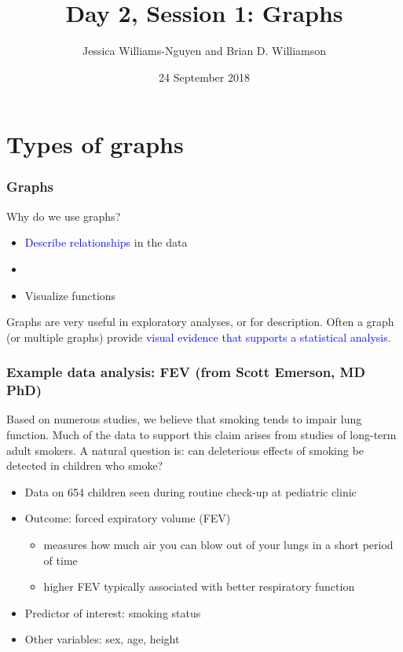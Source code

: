 \documentclass[11pt, hyperref={colorlinks, urlcolor=blue}]{beamer}
\title{Day 2, Session 1: Graphs}
\author{Jessica Williams-Nguyen and Brian D. Williamson}
\institute{EPI/BIOST Bootcamp 2018}
\date{24 September 2018}
\newcommand{\myframe}[1]{\begin{frame} \frametitle{#1}}
\newenvironment{spaceitemize}
{ \begin{itemize}
    \setlength{\itemsep}{10pt}
    \setlength{\parskip}{0pt}
    \setlength{\parsep}{0pt}     }
{ \end{itemize}                  }
\begin{document}
\begin{frame}
\titlepage
\end{frame}

\section{Types of graphs}
\myframe{Graphs}
Why do we use graphs?
\begin{itemize}
\item \textcolor{blue}{Describe relationships} in the data
\item[]
\item Visualize functions
\end{itemize}

Graphs are very useful in exploratory analyses, or for description. Often a graph (or multiple graphs) provide \textcolor{blue}{visual evidence that supports a statistical analysis}.

\end{frame}

\myframe{Example data analysis: FEV \small (from Scott Emerson, MD PhD)}
Based on numerous studies, we believe that smoking tends to impair lung function. Much of the data to support this claim arises from studies of long-term adult smokers. A natural question is: can deleterious effects of smoking be detected in children who smoke?
\begin{spaceitemize}
\item Data on 654 children seen during routine check-up at pediatric clinic
\item Outcome: forced expiratory volume (FEV)
\begin{itemize}
\item measures how much air you can blow out of your lungs in a short period of time
\item higher FEV typically associated with better respiratory function
\end{itemize}
\item Predictor of interest: smoking status
\item Other variables: sex, age, height
\end{spaceitemize}
\end{frame}
\end{document}
